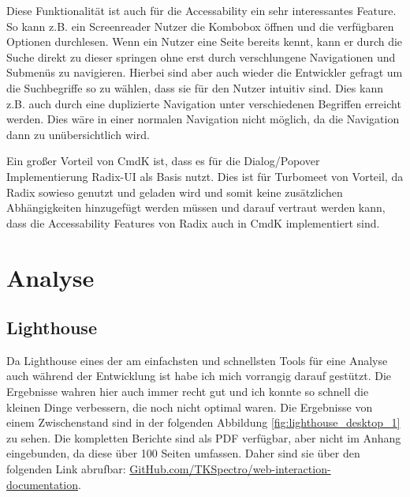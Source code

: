 Diese Funktionalität ist auch für die Accessability ein sehr interessantes Feature. So kann z.B. ein Screenreader Nutzer die Kombobox öffnen und die verfügbaren Optionen durchlesen. Wenn ein Nutzer eine Seite bereits kennt, kann er durch die Suche direkt zu dieser springen ohne erst durch verschlungene Navigationen und Submenüs zu navigieren. Hierbei sind aber auch wieder die Entwickler gefragt um die Suchbegriffe so zu wählen, dass sie für den Nutzer intuitiv sind. Dies kann z.B. auch durch eine duplizierte Navigation unter verschiedenen Begriffen erreicht werden. Dies wäre in einer normalen Navigation nicht möglich, da die Navigation dann zu unübersichtlich wird.

Ein großer Vorteil von CmdK ist, dass es für die Dialog/Popover Implementierung Radix-UI als Basis nutzt. Dies ist für Turbomeet von Vorteil, da Radix sowieso genutzt und geladen wird und somit keine zusätzlichen Abhängigkeiten hinzugefügt werden müssen und darauf vertraut werden kann, dass die Accessability Features von Radix auch in CmdK implementiert sind.

\section{Analyse}

\subsection{Lighthouse}
\label{ssec:lighthouse}

Da Lighthouse eines der am einfachsten und schnellsten Tools für eine Analyse auch während der Entwicklung ist habe ich mich vorrangig darauf gestützt. Die Ergebnisse wahren hier auch immer recht gut und ich konnte so schnell die kleinen Dinge verbessern, die noch nicht optimal waren. Die Ergebnisse von einem Zwischenstand sind in der folgenden Abbildung \ref{fig:lighthouse_desktop_1} zu sehen. Die kompletten Berichte sind als PDF verfügbar, aber nicht im Anhang eingebunden, da diese über 100 Seiten umfassen. Daher sind sie über den folgenden Link abrufbar: \href{https://github.com/TKSpectro/web-interaction-documentation/tree/master/Reports}{GitHub.com/TKSpectro/web-interaction-documentation}.

